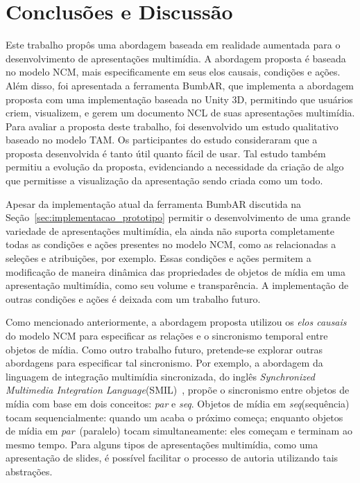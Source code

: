 \documentclass[../main.tex]{subfiles}
\begin{document}
\chapter{Conclusões e Discussão}\label{cap:conclusoes}

Este trabalho propôs uma abordagem baseada em realidade aumentada para o desenvolvimento de apresentações multimídia. A abordagem proposta é baseada no modelo NCM, mais especificamente em seus elos causais, condições e ações. Além disso, foi apresentada a ferramenta BumbAR, que implementa a abordagem proposta com uma implementação baseada no Unity 3D, permitindo que usuários criem, visualizem, e gerem um documento NCL de suas apresentações multimídia. Para avaliar a proposta deste trabalho, foi desenvolvido um estudo qualitativo baseado no modelo TAM. Os participantes do estudo consideraram que a proposta desenvolvida é tanto útil quanto fácil de usar. Tal estudo também permitiu a evolução da proposta, evidenciando a necessidade da criação de algo que permitisse a visualização da apresentação sendo criada como um todo.

Apesar da implementação atual da ferramenta BumbAR discutida na Seção~\ref{sec:implementacao_prototipo} permitir o desenvolvimento de uma grande variedade de apresentações multimídia, ela ainda não suporta completamente todas as condições e ações presentes no modelo NCM, como as relacionadas a seleções e atribuições, por exemplo. Essas condições e ações permitem a modificação de maneira dinâmica das propriedades de objetos de mídia em uma apresentação multimídia, como seu volume e transparência. A implementação de outras condições e ações é deixada com um trabalho futuro.

Como mencionado anteriormente, a abordagem proposta utilizou os \emph{elos causais} do modelo NCM para especificar as relações e o sincronismo temporal entre objetos de mídia. Como outro trabalho futuro, pretende-se explorar outras abordagens para especificar tal sincronismo. Por exemplo, a abordagem da linguagem de integração multimídia sincronizada, do inglês \emph{Synchronized Multimedia Integration Language}(SMIL)~\cite{rutledge2001smil}, propõe o sincronismo entre objetos de mídia com base em dois conceitos: \emph{par} e \emph{seq}. Objetos de mídia em \emph{seq}(sequência) tocam sequencialmente: quando um acaba o próximo começa; enquanto objetos de mídia em \emph{par}~(paralelo) tocam simultaneamente: eles começam e terminam ao mesmo tempo. Para alguns tipos de apresentações multimídia, como uma apresentação de slides, é possível facilitar o processo de autoria utilizando tais abstrações.
\end{document}

